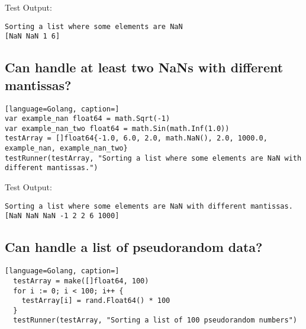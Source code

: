 \documentclass{article}
\begin{document}
Test Output:
\begin{lstlisting}
Sorting a list where some elements are NaN
[NaN NaN 1 6]
\end{lstlisting}

\subsection{Can handle at least two NaNs with different mantissas?}
\begin{lstlisting}[language=Golang, caption=]
var example_nan float64 = math.Sqrt(-1)
var example_nan_two float64 = math.Sin(math.Inf(1.0))
testArray = []float64{-1.0, 6.0, 2.0, math.NaN(), 2.0, 1000.0, example_nan, example_nan_two}
testRunner(testArray, "Sorting a list where some elements are NaN with different mantissas.")
\end{lstlisting}

Test Output:
\begin{lstlisting}
Sorting a list where some elements are NaN with different mantissas.
[NaN NaN NaN -1 2 2 6 1000]
\end{lstlisting}

\subsection{Can handle a list of pseudorandom data?}
\begin{lstlisting}[language=Golang, caption=]
  testArray = make([]float64, 100)
  for i := 0; i < 100; i++ {
    testArray[i] = rand.Float64() * 100
  }
  testRunner(testArray, "Sorting a list of 100 pseudorandom numbers")
\end{lstlisting}
\end{document}
